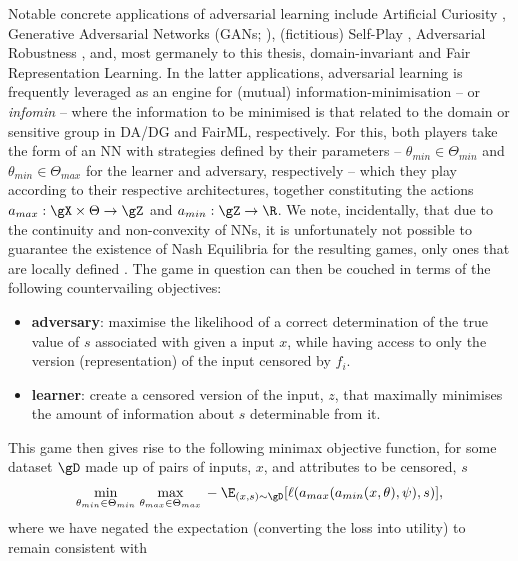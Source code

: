Notable concrete applications of adversarial learning include Artificial Curiosity
\citep{schmidhuber1992learning}, Generative Adversarial Networks (GANs;
\cite{goodfellow14generative}), (fictitious) Self-Play \citep{silver2018general}, Adversarial
Robustness \citep{szegedy2013intriguing}, and, most germanely to this thesis, domain-invariant
\citep{ganin2016domain, zhao2019learning} and Fair \citep{edwards2015censoring, madras2018learning}
Representation Learning.
%
In the latter applications, adversarial learning is frequently leveraged as an engine for
(mutual) information-minimisation -- or \emph{infomin} -- where the information to be minimised is that
related to the domain or sensitive group in DA/DG and FairML, respectively.
%
For this, both players take the form of an NN with strategies defined by their parameters --
\(\theta_{min} \in \Theta_{min}\) and \(\theta_{min} \in \Theta_{max}\) for the learner and
adversary, respectively -- which they play according to their respective architectures, together
constituting the actions \(a_{max}: \gX \times \Theta \to \gZ \) and \(a_{min}: \gZ \time \Psi \to
\R \).
%
We note, incidentally, that due to the continuity and non-convexity of NNs, it is unfortunately not
possible to guarantee the existence of Nash Equilibria for the resulting games, only ones that are
locally defined \citep{unterthiner2018coulomb}.
%
The game in question can then be couched in terms of the following countervailing objectives:
%
\begin{itemize}
  \item \textbf{adversary}: maximise the likelihood of a correct determination of the true value of
    \(s\) associated with given a input \(x\), while having access to only the version
    (representation) of the input censored by \(f_i\).
  \item \textbf{learner}: create a censored version of the input, \(z\), that maximally minimises the
    amount of information about \(s\) determinable from it. 
\end{itemize}
%
This game then gives rise to the following minimax objective function, for some dataset \(\gD\)
made up of pairs of inputs, \(x\), and attributes to be censored, \(s\)
%
\begin{align}\label{eq:minimax-obj}
  \underset{\theta_{min} \in \Theta_{min}}{\text{min}}\; \underset{\theta_{max} \in
  \Theta_{max}}{\text{max}}\,
%
-\E_{(x, s) \sim \gD} [ \ell(a_{max}( a_{min}(x, \theta), \psi ), s ) ],
%
\end{align}
%
where we have negated the expectation (converting the loss into utility) to remain consistent with
